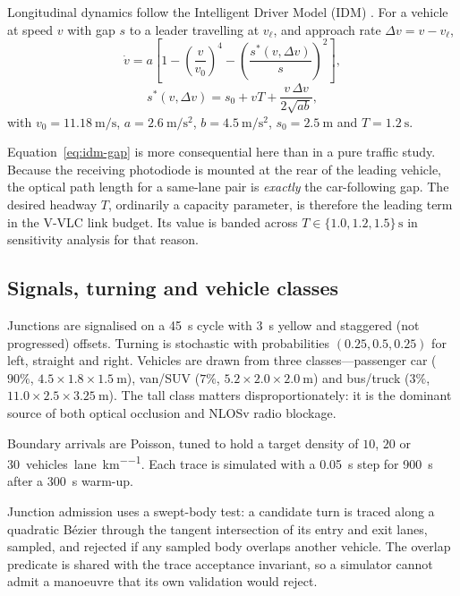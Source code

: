 \documentclass[conference]{IEEEtran}
\begin{document}
Longitudinal dynamics follow the Intelligent Driver Model (IDM)
\cite{treiber2000}. For a vehicle at speed $v$ with gap $s$ to a leader
travelling at $v_\ell$, and approach rate $\Delta v = v - v_\ell$,
\begin{equation}
\dot v = a\left[1-\left(\frac{v}{v_0}\right)^{4}
- \left(\frac{s^{*}(v,\Delta v)}{s}\right)^{2}\right],
\end{equation}
\begin{equation}
s^{*}(v,\Delta v) = s_0 + vT + \frac{v\,\Delta v}{2\sqrt{ab}},
\label{eq:idm-gap}
\end{equation}
with $v_0=\SI{11.18}{\meter\per\second}$, $a=\SI{2.6}{\meter\per\second\squared}$,
$b=\SI{4.5}{\meter\per\second\squared}$, $s_0=\SI{2.5}{\meter}$ and
$T=\SI{1.2}{\second}$.

Equation~\eqref{eq:idm-gap} is more consequential here than in a pure traffic
study. Because the receiving photodiode is mounted at the rear of the leading
vehicle, the optical path length for a same-lane pair is \emph{exactly} the
car-following gap. The desired headway $T$, ordinarily a capacity parameter,
is therefore the leading term in the V-VLC link budget. Its value is banded
across $T\in\{1.0,1.2,1.5\}\,\si{\second}$ in sensitivity analysis for that
reason.

\subsection{Signals, turning and vehicle classes}

Junctions are signalised on a \SI{45}{\second} cycle with \SI{3}{\second}
yellow and staggered (not progressed) offsets. Turning is stochastic with
probabilities $(0.25,0.5,0.25)$ for left, straight and right. Vehicles are
drawn from three classes---passenger car ($90\%$, $4.5\times1.8\times
\SI{1.5}{\meter}$), van/SUV ($7\%$, $5.2\times2.0\times\SI{2.0}{\meter}$) and
bus/truck ($3\%$, $11.0\times2.5\times\SI{3.25}{\meter}$). The tall class
matters disproportionately: it is the dominant source of both optical
occlusion and NLOSv radio blockage.

Boundary arrivals are Poisson, tuned to hold a target density of $10$, $20$ or
\SI{30}{vehicles\per lane\per\kilo\meter}. Each trace is simulated with a
\SI{0.05}{\second} step for \SI{900}{\second} after a \SI{300}{\second}
warm-up.

Junction admission uses a swept-body test: a candidate turn is traced along a
quadratic B\'ezier through the tangent intersection of its entry and exit
lanes, sampled, and rejected if any sampled body overlaps another vehicle.
The overlap predicate is shared with the trace acceptance invariant, so a
simulator cannot admit a manoeuvre that its own validation would reject.
\end{document}
